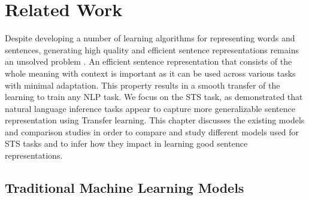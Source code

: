 \documentclass[12pt]{report} %
\begin{document}
%
%
%
% 


\chapter{Related Work}


Despite developing a number of learning algorithms for representing words and sentences, generating high quality and efficient sentence representations remains an unsolved problem \citep{conneau2017supervised}. An efficient sentence representation that consists of the whole meaning with context is important as it can be used across various tasks with minimal adaptation. This property results in a smooth transfer of the learning to train any NLP task. We focus on the STS task, as \cite{conneau2017supervised} demonstrated that natural language inference tasks appear to capture more generalizable sentence representation using Transfer learning. This chapter discusses the existing models and comparison studies in order to compare and study different models used for STS tasks and to infer how they impact in learning good sentence representations.

\section{Traditional Machine Learning Models}
\end{document}
